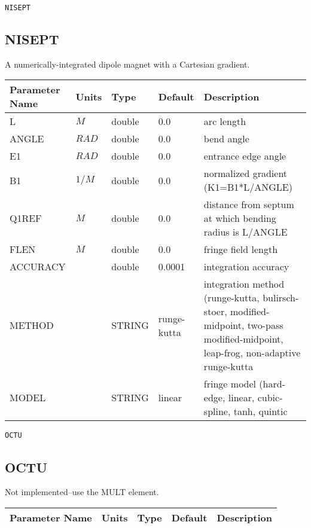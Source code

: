 \begin{latexonly}
\newpage
\begin{center}{\Large\verb|NISEPT|}\end{center}
\end{latexonly}\subsection{NISEPT}
A numerically-integrated dipole magnet with a Cartesian gradient.
\\
\begin{tabular}{|l|l|l|l|p{\descwidth}|} \hline
Parameter Name & Units & Type & Default & Description \\ \hline 
L & $M$ & double &  0.0 & arc length  \\ \hline 
ANGLE & $RAD$ & double &  0.0 & bend angle  \\ \hline 
E1 & $RAD$ & double &  0.0 & entrance edge angle  \\ \hline 
B1 & $1/M$ & double &  0.0 & normalized gradient (K1=B1*L/ANGLE)  \\ \hline 
Q1REF & $M$ & double &  0.0 & distance from septum at which bending radius is L/ANGLE  \\ \hline 
FLEN & $M$ & double &  0.0 & fringe field length  \\ \hline 
ACCURACY &  & double &   0.0001 & integration accuracy  \\ \hline 
METHOD &  & STRING &   runge-kutta     & integration method (runge-kutta, bulirsch-stoer, modified-midpoint, two-pass modified-midpoint, leap-frog, non-adaptive runge-kutta  \\ \hline 
MODEL &  & STRING &   linear          & fringe model (hard-edge, linear, cubic-spline, tanh, quintic  \\ \hline 
\end{tabular}

\begin{latexonly}
\newpage
\begin{center}{\Large\verb|OCTU|}\end{center}
\end{latexonly}\subsection{OCTU}
Not implemented--use the MULT element.
\\
\begin{tabular}{|l|l|l|l|p{\descwidth}|} \hline
Parameter Name & Units & Type & Default & Description \\ \hline 
\end{tabular}

